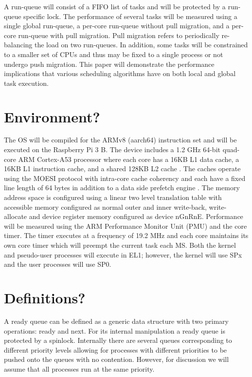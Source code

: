 \documentclass[11pt]{article}
\begin{document}
A run-queue will consist of a FIFO list of tasks and will be protected by a run-queue specific lock.  The performance of several tasks will be measured using a single global run-queue, a per-core run-queue without pull migration, and a per-core run-queue with pull migration.  Pull migration refers to periodically re-balancing the load on two run-queues.  In addition, some tasks will be constrained to a smaller set of CPUs and thus may be fixed to a single process or not undergo push migration.  This paper will demonstrate the performance implications that various scheduling algorithms have on both local and global task execution.

\section{Environment?}
\label{sec:environment?}
The OS will be compiled for the ARMv8 (aarch64) instruction set and will be executed on the Raspberry Pi 3 B.  The device includes a 1.2 GHz 64-bit quad-core ARM Cortex-A53 processor where each core has a 16KB L1 data cache, a 16KB L1 instruction cache, and a shared 128KB L2 cache \cite{arm-l1-about} \cite{arm-l2-about}.  The caches operate using the MOESI protocol with intra-core cache coherency and each have a fixed line length of 64 bytes in addition to a data side prefetch engine \cite{arm-l1-coherency} \cite{arm-l1-prefetch}.  The memory address space is configured using a linear two level translation table with accessible memory configured as normal outer and inner write-back, write-allocate and device register memory configured as device nGnRnE.  Performance will be measured using the ARM Performance Monitor Unit (PMU) and the core timer.  The timer executes at a frequency of 19.2 MHz \cite{bcm2386} and each core maintains its own core timer which will preempt the current task each MS.  Both the kernel and pseudo-user processes will execute in EL1; however, the kernel will use SPx and the user processes will use SP0.

\section{Definitions?}
\label{sec:definitions?}

A ready queue can be defined as a generic data structure with two primary operations: ready and next.  For its internal manipulation a ready queue is protected by a spinlock.  Internally there are several queues corresponding to different priority levels allowing for processes with different priorities to be pushed onto the queues with no contention.  However, for discussion we will assume that all processes run at the same priority.
\end{document}
